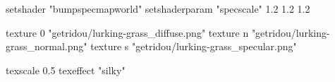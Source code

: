 setshader "bumpspecmapworld"
setshaderparam "specscale" 1.2 1.2 1.2

   texture 0 "getridou/lurking-grass_diffuse.png"
   texture n "getridou/lurking-grass_normal.png"
   texture s "getridou/lurking-grass_specular.png"

texscale 0.5
texeffect "silky"

